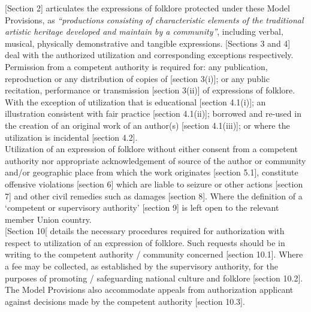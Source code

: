 \documentclass[11pt]{article}
\begin{document}
[Section 2]\cite{wipo85_model_provi_national_laws_folklore} articulates the
expressions of folklore protected under these Model Provisions, as
\emph{``productions consisting of characteristic elements of the traditional artistic
heritage developed and maintain by a community''}, including verbal, musical,
physically demonstrative and tangible expressions. [Sections 3 and
4]\cite{wipo85_model_provi_national_laws_folklore} deal with the authorized
utilization and corresponding exceptions respectively. Permission from a
competent authority is required for: any publication, reproduction or any
distribution of copies of [section
3(i)]\cite{wipo85_model_provi_national_laws_folklore}; or any public recitation,
performance or transmission [section
3(ii)]\cite{wipo85_model_provi_national_laws_folklore} of expressions of folklore.
With the exception of utilization that is educational [section
4.1(i)]\cite{wipo85_model_provi_national_laws_folklore}; an illustration
consistent with fair practice [section
4.1(ii)]\cite{wipo85_model_provi_national_laws_folklore}; borrowed and re-used in
the creation of an original work of an author(s) [section
4.1(iii)]\cite{wipo85_model_provi_national_laws_folklore}; or where the
utilization is incidental [section
4.2]\cite{wipo85_model_provi_national_laws_folklore}.\\

Utilization of an expression of folklore without either consent from a competent
authority nor appropriate acknowledgement of source of the author or community
and/or geographic place from which the work originates [section
5.1]\cite{wipo85_model_provi_national_laws_folklore}, constitute offensive
violations [section 6]\cite{wipo85_model_provi_national_laws_folklore} which are
liable to seizure or other actions [section
7]\cite{wipo85_model_provi_national_laws_folklore} and other civil remedies such
as damages [section 8]\cite{wipo85_model_provi_national_laws_folklore}. Where the
definition of a `competent or supervisory authority' [section
9]\cite{wipo85_model_provi_national_laws_folklore} is left open to the relevant
member Union country.\\

[Section 10[\cite{wipo85_model_provi_national_laws_folklore} details the necessary
procedures required for authorization with respect to utilization of an
expression of folklore. Such requests should be in writing to the competent
authority / community concerned [section
10.1]\cite{wipo85_model_provi_national_laws_folklore}. Where a fee may be
collected, as established by the supervisory authority, for the purposes of
promoting / safeguarding national culture and folklore [section
10.2]\cite{wipo85_model_provi_national_laws_folklore}. The Model Provisions also
accommodate appeals from authorization applicant against decisions made by the
competent authority [section
10.3]\cite{wipo85_model_provi_national_laws_folklore}.\\
\end{document}
